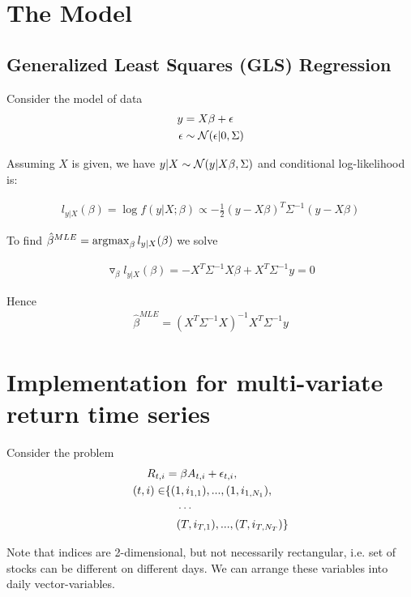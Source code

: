 \section{The Model}
\subsection{Generalized Least Squares (GLS) Regression}
Consider the model of data
\begin{align}
	y &= X \beta + \epsilon  \\
	\epsilon &\sim \mathcal{N}(\epsilon| 0, \Sigma) \nonumber
\end{align}

Assuming $X$ is given, we have $y|X \sim \mathcal{N}(y| X \beta, \Sigma)$ and conditional log-likelihood is:

\begin{align*}
	l_{y|X}(\beta) = \log f(y|X; \beta) \propto -\frac{1}{2} (y - X\beta)^T \Sigma^{-1} (y - X \beta)
\end{align*}

To find $\hat{\beta}^{MLE} = \operatorname*{argmax}_\beta  l_{y|X}(\beta)$ we solve


\begin{align*}
	\triangledown_{\beta} l_{y|X}(\beta) = - X^T \Sigma^{-1} X \beta + X^T \Sigma^{-1} y = 0
\end{align*}

Hence
\begin{align}
	\label{eq:beta_mle}
	\hat{\beta}^{MLE} = (X^T \Sigma^{-1} X)^{-1} X^T \Sigma^{-1} y
\end{align}


\section{Implementation for multi-variate return time series}
Consider the problem 
\begin{align}\label{eq:return_alpha}
	R_{t,i} &= \beta A_{t,i} + \epsilon_{t,i}, \\
	(t,i) \in &\{(1, i_{1,1}),...,(1, i_{1, N_1}),\notag\\
	&\phantom{\in\ }\cdots\notag\\
	&\phantom{\in\ }(T, i_{T,1}),...,(T, i_{T, N_T})\} \notag
\end{align}


Note that indices are 2-dimensional, but not necessarily rectangular, i.e. set of stocks can be different on different days. We can arrange these variables into daily vector-variables.


